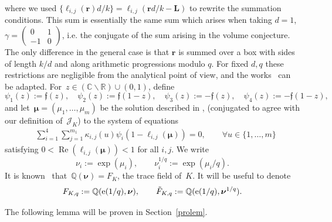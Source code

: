 \documentclass[11pt]{amsart}
\newcommand{\R}{\mathbb{R}}
\newcommand{\Q}{\mathbb{Q}}
\newcommand{\C}{\mathbb{C}}
\newcommand{\br}{{\boldsymbol r}}
\newcommand{\J}{\mathcal{J}}
\newcommand{\lf}{{\mathfrak f}}
\theoremstyle{definition}
\newcommand{\pr}[1]{\mathchoice{\left( #1\right)}{(#1)}{(#1)}{(#1)}}
\newcommand{\e}[1][]{\ifthenelse{\equal{#1}{}}{{\rm e}}{\operatorname{e}\pr{ #1}}}
\newcommand{\bs}{\boldsymbol }
\renewcommand\Re{\operatorname{Re}}
\newcommand{\1}{{\mathbf 1}}
\let\originalleft\left
\let\originalright\right
\renewcommand{\left}{\mathopen{}\mathclose\bgroup\originalleft}
\renewcommand{\right}{\aftergroup\egroup\originalright}
\numberwithin{equation}{section}
\begin{document}
where we used $\{\ell_{i,j}(\boldsymbol r) d/k\}=\ell_{i,j}(\boldsymbol r d/k- \bs L)$ to rewrite the summation conditions.
This sum is essentially the same sum which arises when taking $d=1$, $\gamma=(\begin{smallmatrix}0 & 1\\ -1 &0\end{smallmatrix})$, i.e. the conjugate of the sum arising in the volume conjecture. The only difference in the general case is that $\br$ is summed over a box with sides of length $k/d$ and along arithmetic progressions modulo $q$.  For fixed $d,q$ these restrictions are negligible from the analytical point of view, and the works~\cite{Ohtsuki52,OhtsukiYokota6,Ohtsuki7} can be adapted. For~$z\in(\C\smallsetminus\R)\cup (0, 1)$, define
$$ \psi_1(z):=\lf(z), \quad \psi_2(z):=\lf(1-z), \quad \psi_3(z):=-\lf(z), \quad \psi_4(z):=-\lf(1-z), $$
and let~$\bs\mu=(\mu_1,\dots,\mu_m)$ be the solution described in \cite[\S5.1]{Ohtsuki52}, \cite[\S3.3, \S4.3, \S5.3]{OhtsukiYokota6} \cite[\S3.3, \S4.3, \S5.3, \S6.3, \S7.3]{Ohtsuki7} (conjugated to agree with our definition of~$\J_K$) to the system of equations
\begin{align}\label{spe}
  &\sum_{i=1}^4\sum_{j=1}^{m_1}\kappa_{i,j}(u)\psi_i (1-\ell_{i,j}(\bs\mu)) = 0,\qquad \forall u\in\{1,\dots,m\}
\end{align}
satisfying $0<\Re(\ell_{i,j}(\bs\mu))<1$ for all $i,j$. We write
$$ \nu_i:=\exp(\mu_i), \qquad \nu_i^{1/q}:=\exp(\mu_i/q). $$
It is known~\cite{Ohtsuki52,OhtsukiYokota6,Ohtsuki7} that~$\Q(\bs \nu) = F_K$, the trace field of~$K$. It will be useful to denote
$$ F_{K, q} := \Q(\e[1/q],\bs \nu), \qquad {\tilde F}_{K, q} := \Q(\e[1/q], \bs \nu^{1/q}). $$

The following lemma will be proven in Section~\ref{prolem}.
\end{document}
